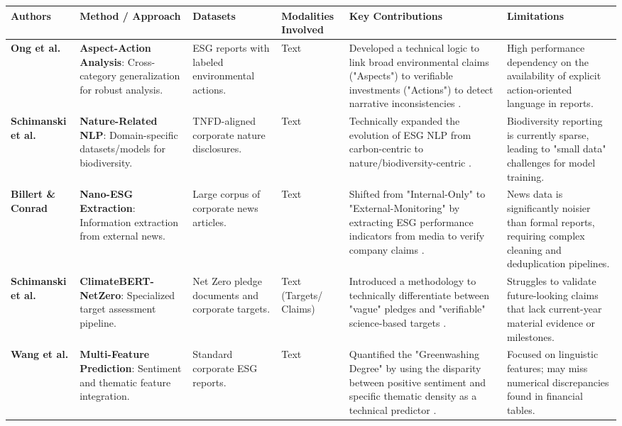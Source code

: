 \documentclass[english, online, cse, master]{dithesis}
\begin{document}
\begin{landscape}
\begin{table}[p]
\centering
\small
\renewcommand{\arraystretch}{1.2}
\begin{tabularx}{\linewidth}{|p{1.8cm}|p{3.5cm}|p{3cm}|p{1.8cm}|X|X|}
\hline
Authors & Method / Approach & Datasets & Modalities Involved & Key Contributions & Limitations \\ \hline
\textbf{Ong et al.}  \parencite{keane_ong_369a0b63} & \textbf{Aspect-Action Analysis}: Cross-category generalization for robust analysis. & ESG reports with labeled environmental actions. & Text & Developed a technical logic to link broad environmental claims ("Aspects") to verifiable investments ("Actions") to detect narrative inconsistencies  \parencite{keane_ong_369a0b63}. & High performance dependency on the availability of explicit action-oriented language in reports. \\ \hline
\textbf{Schimanski et al.}  \parencite{tobias_schimanski_3549ff9f} & \textbf{Nature-Related NLP}: Domain-specific datasets/models for biodiversity. & TNFD-aligned corporate nature disclosures. & Text & Technically expanded the evolution of ESG NLP from carbon-centric to nature/biodiversity-centric  \parencite{tobias_schimanski_3549ff9f}. & Biodiversity reporting is currently sparse, leading to "small data" challenges for model training. \\ \hline
\textbf{Billert \& Conrad}  \parencite{fabian_billert_a5fbb687} & \textbf{Nano-ESG Extraction}: Information extraction from external news. & Large corpus of corporate news articles. & Text & Shifted from "Internal-Only" to "External-Monitoring" by extracting ESG performance indicators from media to verify company claims  \parencite{fabian_billert_a5fbb687}. & News data is significantly noisier than formal reports, requiring complex cleaning and deduplication pipelines. \\ \hline
\textbf{Schimanski et al.}  \parencite{tobias_schimanski_241ada20} & \textbf{ClimateBERT-NetZero}: Specialized target assessment pipeline. & Net Zero pledge documents and corporate targets. & Text (Targets/ Claims) & Introduced a methodology to technically differentiate between "vague" pledges and "verifiable" science-based targets  \parencite{tobias_schimanski_241ada20}. & Struggles to validate future-looking claims that lack current-year material evidence or milestones. \\ \hline
\textbf{Wang et al.}  \parencite{xiaojia_wang_02351a60} & \textbf{Multi-Feature Prediction}: Sentiment and thematic feature integration. & Standard corporate ESG reports. & Text & Quantified the "Greenwashing Degree" by using the disparity between positive sentiment and specific thematic density as a technical predictor  \parencite{xiaojia_wang_02351a60}. & Focused on linguistic features; may miss numerical discrepancies found in financial tables. \\ \hline

\end{tabularx}
\end{table}
\end{landscape}
\end{document}
